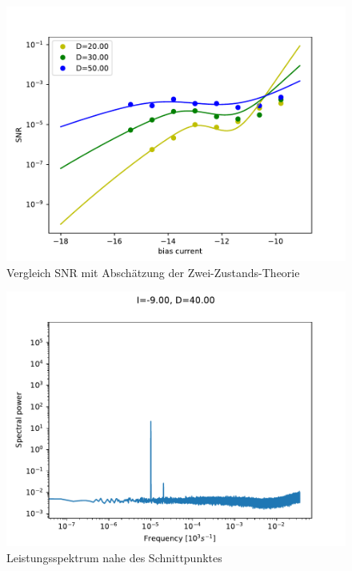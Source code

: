 \documentclass[12pt,a4paper]{article}
\begin{document}
\begin{figure}[H]
	\centering
	\includegraphics[scale=1]{snrinzelcompsprate4.pdf}\caption{Vergleich SNR mit Abschätzung der Zwei-Zustands-Theorie}
	\label{snrinzelcomprate}
\end{figure}
\begin{figure}[H]
	\centering
	\includegraphics[scale=1]{inapikpoi.pdf}\caption{Leistungsspektrum nahe des Schnittpunktes}
	\label{inapikpoi}
\end{figure}
\end{document}
